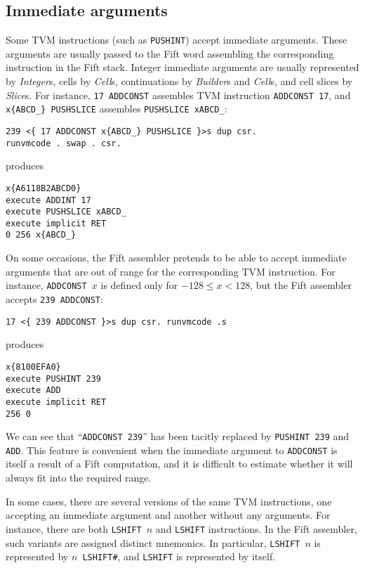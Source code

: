 \documentclass[12pt,oneside]{article}
\def\mysubsection#1{\subsection{#1}\fancyhead[C]{\small{\textsc{\textrm{\thesubsection.} #1}}}}
\begin{document}
\mysubsection{Immediate arguments}
Some TVM instructions (such as {\tt PUSHINT}) accept immediate arguments. These arguments are usually passed to the Fift word assembling the corresponding instruction in the Fift stack. Integer immediate arguments are usually represented by {\em Integer\/}s, cells by {\em Cell\/}s, continuations by {\em Builder\/}s and {\em Cell\/}s, and cell slices by {\em Slice\/}s. For instance, {\tt 17 ADDCONST} assembles TVM instruction {\tt ADDCONST 17}, and {\tt x\{ABCD\_\} PUSHSLICE} assembles {\tt PUSHSLICE xABCD\_}:
\begin{verbatim}
239 <{ 17 ADDCONST x{ABCD_} PUSHSLICE }>s dup csr.
runvmcode . swap . csr.
\end{verbatim}
produces
\begin{verbatim}
x{A6118B2ABCD0}
execute ADDINT 17
execute PUSHSLICE xABCD_
execute implicit RET
0 256 x{ABCD_}
\end{verbatim}

On some occasions, the Fift assembler pretends to be able to accept immediate arguments that are out of range for the corresponding TVM instruction. For instance, {\tt ADDCONST $x$} is defined only for $-128\leq x<128$, but the Fift assembler accepts {\tt 239 ADDCONST}:
\begin{verbatim}
17 <{ 239 ADDCONST }>s dup csr. runvmcode .s
\end{verbatim}
produces
\begin{verbatim}
x{8100EFA0}
execute PUSHINT 239
execute ADD
execute implicit RET
256 0
\end{verbatim}
We can see that ``{\tt ADDCONST 239}'' has been tacitly replaced by {\tt PUSHINT 239} and {\tt ADD}. This feature is convenient when the immediate argument to {\tt ADDCONST} is itself a result of a Fift computation, and it is difficult to estimate whether it will always fit into the required range.

In some cases, there are several versions of the same TVM instructions, one accepting an immediate argument and another without any arguments. For instance, there are both {\tt LSHIFT $n$} and {\tt LSHIFT} instructions. In the Fift assembler, such variants are assigned distinct mnemonics. In particular, {\tt LSHIFT $n$} is represented by {\tt $n$ LSHIFT\#}, and {\tt LSHIFT} is represented by itself.
\end{document}
